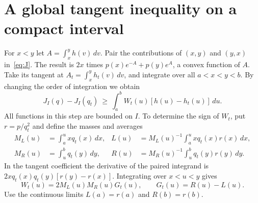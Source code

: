 \documentclass[11pt]{article}
\begin{document}
\section{A global tangent inequality on a compact interval}
For $x<y$ let $A=\int_x^y h(v)\,dv$. Pair the contributions of $(x,y)$
and $(y,x)$ in~\eqref{eq:J}. The result is $2x$ times
$p(x)e^{-A}+p(y)e^A$, a convex function of $A$.
Take its tangent at $A_t=\int_x^y h_t(v)\,dv$, and integrate over all
$a<x<y<b$. By changing the order of integration we obtain
\begin{equation}\label{eq:tangent}
 J_I(q)-J_I(q_t)\ \ge\
 \int_a^b W_t(u)[h(u)-h_t(u)]\,du .
\end{equation}
All functions in this step are bounded on $I$. To determine the sign of
$W_t$, put $r=p/q_t^2$ and define the masses and averages
\begin{align*}
 M_L(u)&=\int_a^u xq_t(x)\,dx,&
 L(u)&=M_L(u)^{-1}\int_a^u xq_t(x)r(x)\,dx,\\
 M_R(u)&=\int_u^b q_t(y)\,dy,&
 R(u)&=M_R(u)^{-1}\int_u^b q_t(y)r(y)\,dy .
\end{align*}
In the tangent coefficient the derivative of the paired integrand is
$2xq_t(x)q_t(y)[r(y)-r(x)]$. Integrating over $x<u<y$ gives
\[
 W_t(u)=2M_L(u)M_R(u)G_t(u),\qquad G_t(u)=R(u)-L(u).
\]
Use the continuous limits $L(a)=r(a)$ and $R(b)=r(b)$.
\end{document}
